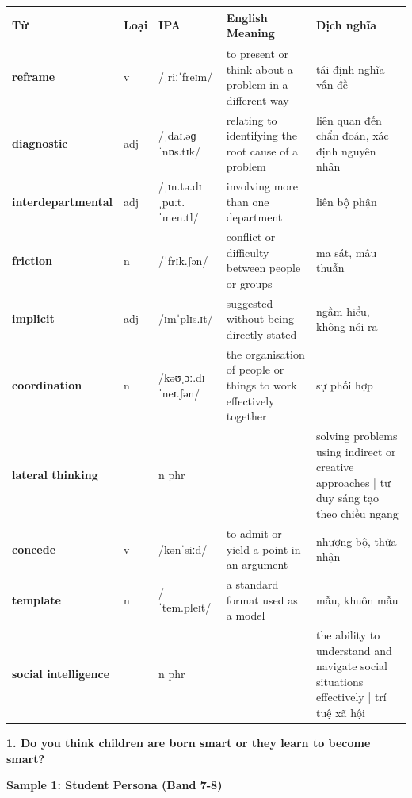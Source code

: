 \vspace{0.8em}
\begin{center}
\renewcommand{\arraystretch}{1.65}
\begin{tabularx}{\textwidth}{|V{0.22\textwidth}|C{0.07\textwidth}|I{0.20\textwidth}|Y|V{0.18\textwidth}|}
\hline
{}
\textbf{Từ} & \textbf{Loại} & \textbf{IPA} & \textbf{English Meaning} & \textbf{Dịch nghĩa} \\
\hline
\textbf{reframe} & v & /ˌriːˈfreɪm/ & to present or think about a problem in a different way & tái định nghĩa vấn đề \\ \hline
\textbf{diagnostic} & adj & /ˌdaɪ.əɡˈnɒs.tɪk/ & relating to identifying the root cause of a problem & liên quan đến chẩn đoán, xác định nguyên nhân \\ \hline
\textbf{interdepartmental} & adj & /ˌɪn.tə.dɪˌpɑːt.ˈmen.tl/ & involving more than one department & liên bộ phận \\ \hline
\textbf{friction} & n & /ˈfrɪk.ʃən/ & conflict or difficulty between people or groups & ma sát, mâu thuẫn \\ \hline
\textbf{implicit} & adj & /ɪmˈplɪs.ɪt/ & suggested without being directly stated & ngầm hiểu, không nói ra \\ \hline
\textbf{coordination} & n & /kəʊˌɔː.dɪˈneɪ.ʃən/ & the organisation of people or things to work effectively together & sự phối hợp \\ \hline
\textbf{lateral thinking} & & n phr & & solving problems using indirect or creative approaches | tư duy sáng tạo theo chiều ngang \\ \hline
\textbf{concede} & v & /kənˈsiːd/ & to admit or yield a point in an argument & nhượng bộ, thừa nhận \\ \hline
\textbf{template} & n & /ˈtem.pleɪt/ & a standard format used as a model & mẫu, khuôn mẫu \\ \hline
\textbf{social intelligence} & & n phr & & the ability to understand and navigate social situations effectively | trí tuệ xã hội \\ \hline
\end{tabularx}
\end{center}

\partthreeheader

\begin{ieltsquestion}
\textbf{1. Do you think children are born smart or they learn to become smart?}
\end{ieltsquestion}
\textbf{Sample 1: Student Persona (Band 7-8)}

